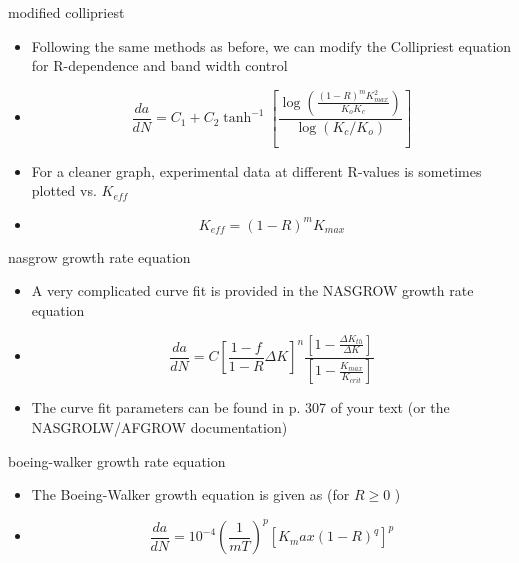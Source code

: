 \documentclass[10pt]{beamer}
\begin{document}
\begin{frame}{modified collipriest}
	\begin{itemize}[<+->]
		\item Following the same methods as before, we can modify the Collipriest equation for R-dependence and band width control
		\item [] \begin{equation}
		\frac{da}{dN} = C_1 + C_2 \tanh^{-1} \left[\frac{\log \left(\frac{(1-R)^mK_{max}^2}{K_oK_c}\right)}{\log (K_c/K_o)}\right]
		\end{equation}
		\item For a cleaner graph, experimental data at different R-values is sometimes plotted vs. $K_{eff}$
		\item[] \begin{equation}
		K_{eff} = (1-R)^m K_{max}
		\end{equation}
	\end{itemize}
\end{frame}

\begin{frame}{nasgrow growth rate equation}
	\begin{itemize}[<+->]
		\item A very complicated curve fit is provided in the NASGROW growth rate equation
		\item[] \begin{equation}
		\frac{da}{dN} = C \left[\frac{1-f}{1-R}\Delta K\right]^n\frac{\left[1-\frac{\Delta K_{th}}{\Delta K}\right]}{\left[1-\frac{K_{max}}{K_{crit}}\right]}
		\end{equation}
		\item The curve fit parameters can be found in p. 307 of your text (or the NASGROLW/AFGROW documentation)
	\end{itemize}
\end{frame}

\begin{frame}{boeing-walker growth rate equation}
	\begin{itemize}[<+->]
		\item The Boeing-Walker growth equation is given as (for $R \ge 0$ )
		\item[] \begin{equation}
		\frac{da}{dN} = 10^{-4}\left(\frac{1}{mT}\right)^p\left[K_max(1-R)^q\right]^p
		\end{equation}
	\end{itemize}
\end{frame}
\end{document}
